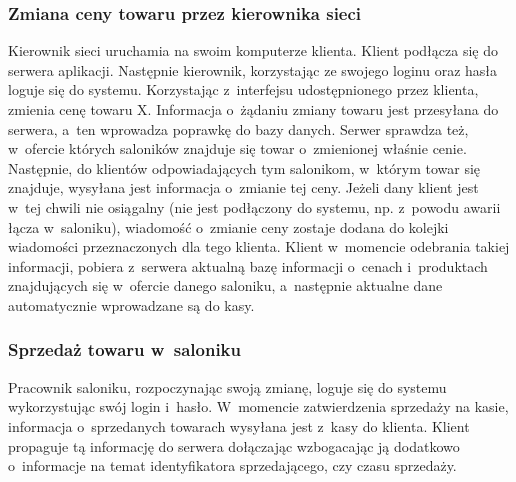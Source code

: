 \subsubsection{Zmiana ceny towaru przez kierownika sieci}
Kierownik sieci uruchamia na swoim komputerze klienta. Klient podłącza się do serwera aplikacji. Następnie kierownik, korzystając ze swojego loginu oraz hasła loguje się do systemu. Korzystając z~interfejsu udostępnionego przez klienta, zmienia cenę towaru X. Informacja o~żądaniu zmiany towaru jest przesyłana do serwera, a~ten wprowadza poprawkę do bazy danych. Serwer sprawdza też, w~ofercie których saloników znajduje się towar o~zmienionej właśnie cenie. Następnie, do klientów odpowiadających tym salonikom, w~którym towar się znajduje, wysyłana jest informacja o~zmianie tej ceny. Jeżeli dany klient jest w~tej chwili nie osiągalny (nie jest podłączony do systemu, np. z~powodu awarii łącza w~saloniku), wiadomość o~zmianie ceny zostaje dodana do kolejki wiadomości przeznaczonych dla tego klienta. Klient w~momencie odebrania takiej informacji, pobiera z~serwera aktualną bazę informacji o~cenach i~produktach znajdujących się w~ofercie danego saloniku, a~następnie aktualne dane automatycznie wprowadzane są do kasy.
\subsubsection{Sprzedaż towaru w~saloniku}
Pracownik saloniku, rozpoczynając swoją zmianę, loguje się do systemu wykorzystując swój login i~hasło. W~momencie zatwierdzenia sprzedaży na kasie, informacja o~sprzedanych towarach wysyłana jest z~kasy do klienta. Klient propaguje tą informację do serwera dołączając wzbogacając ją dodatkowo o~informacje na temat identyfikatora sprzedającego, czy czasu sprzedaży.